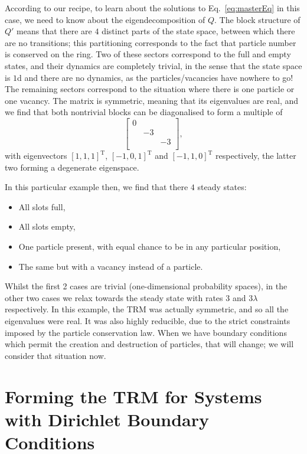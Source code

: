 According to our recipe, to learn about the solutions to Eq.~\ref{eq:masterEq} 
in this case, we need to know about the eigendecomposition of $Q$. 
The block structure of $Q'$ means that there are $4$ 
distinct parts of the state space, between which there are no transitions; this 
partitioning corresponds to the fact that particle number is conserved on the ring.
Two of these
sectors correspond to the full and empty states, and their dynamics are completely
trivial, in the sense that the state space is $1$d and there are no dynamics, as the
particles/vacancies have nowhere to go!
The remaining sectors correspond to the situation where there is one particle or one 
vacancy. The matrix is symmetric, meaning that its eigenvalues are real,
and we find that both nontrivial blocks can be diagonalised to form a multiple of
\begin{equation}
 \begin{bmatrix}
  0  &  &  \\
     &-3&  \\
     &  &-3\\
 \end{bmatrix},
\end{equation}
with eigenvectors $[1, 1, 1]^{\mathrm{T}}$, $[-1, 0, 1]^{\mathrm{T}}$ and
$[-1, 1, 0]^{\mathrm{T}}$ respectively, the latter two forming a degenerate eigenspace.

In this particular example then, we find that there $4$ steady states:
\begin{itemize}
 \item All slots full,
 \item All slots empty,
 \item One particle present, with equal chance to be in any particular position,
 \item The same but with a vacancy instead of a particle.
\end{itemize}
Whilst the first 2 cases are trivial (one-dimensional probability spaces), in the other
two cases we relax towards the steady state with rates $3$ and $3\lambda$ respectively.
In this example, the TRM was actually symmetric, and so all the eigenvalues were real.
It was also highly reducible, due to the strict constraints imposed by the particle
conservation law. When we have boundary conditions which permit the creation and
destruction of particles, that will change; we will consider that situation now.

\section{Forming the TRM for Systems with Dirichlet Boundary Conditions}


